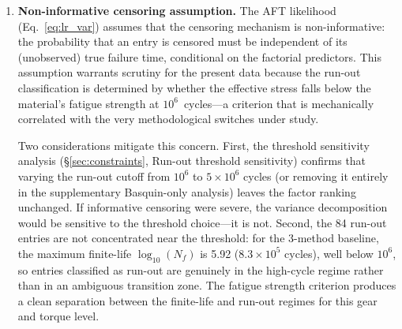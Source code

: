 \documentclass[twocolumn,12pt,a4paper]{article}
\begin{document}
\begin{enumerate}
        I caution that the narrow bootstrap CIs for the dominant factors
        quantify \emph{sampling} variability conditional on the observed
        censoring pattern, not the \emph{identifiability} of the
        underlying parameters. At 58\% censoring, the likelihood surface
        may possess shallow local maxima or flat ridges that bootstrap
        resampling cannot detect because each bootstrap replicate
        inherits the same censoring structure. The numerical variance
        fractions for the three dominant factors (55.3\%, 22.6\%,
        18.2\%) represent the best available
        point estimates under the log-normal AFT specification, not as
        uniquely identified values. As a practical check, the EM decomposition
        was repeated with 8 different random seeds; the variance fractions are
        identical to the reported precision across all seeds, confirming that
        the likelihood surface possesses a well-defined global maximum at 58\%
        censoring for this dataset. Their qualitative ranking
        (Std dominant, Rz $\gtrsim$ MS) holds across all bootstrap replicates
        and sensitivity analyses reported in this study. The S--N
        curve source (2.5\%, CI [1.3, 3.7];
        Table~\ref{tab:anova}) is identifiable, while the cumulative
        damage rule (0.3\%) is at the noise floor of the 58\%-censored
        design and should not be assigned physical interpretation.

  \item \textbf{Non-informative censoring assumption.} The AFT likelihood
        (Eq.~\ref{eq:lr_var}) assumes that the censoring mechanism is
        non-informative: the probability that an entry is censored must
        be independent of its (unobserved) true failure time, conditional
        on the factorial predictors. This assumption warrants scrutiny
        for the present data because the run-out classification is
        determined by whether the effective stress falls below the
        material's fatigue strength at $10^6$~cycles---a criterion that
        is mechanically correlated with the very methodological switches
        under study.

        Two considerations mitigate this concern. First, the threshold
        sensitivity analysis (\S\ref{sec:constraints}, Run-out threshold
        sensitivity) confirms that varying the run-out cutoff from
        $10^6$ to $5\times10^6$ cycles (or removing it entirely in the
        supplementary Basquin-only analysis) leaves the factor ranking
        unchanged. If informative censoring were severe, the variance
        decomposition would be sensitive to the threshold choice---it is
        not. Second, the 84 run-out entries are not concentrated near the
        threshold: for the 3-method baseline, the maximum finite-life
        $\log_{10}(N_f)$ is 5.92 ($8.3\times10^5$ cycles), well below
        $10^6$, so entries classified as run-out are genuinely in the
        high-cycle regime rather than in an ambiguous transition zone.
        The fatigue strength criterion produces a clean separation
        between the finite-life and run-out regimes for this gear and
        torque level.


\end{enumerate}
\end{document}
